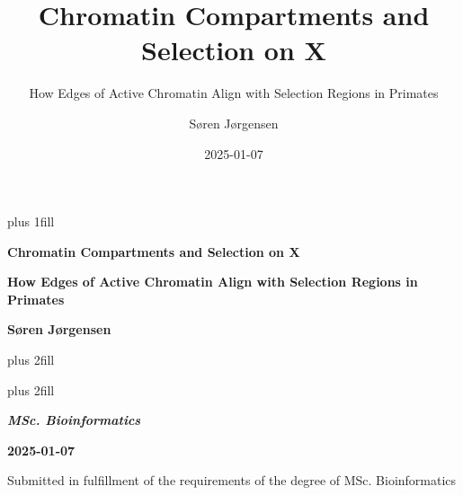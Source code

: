 \documentclass[
  11pt,
  a4paper,
]{scrbook}
\title{Chromatin Compartments and Selection on X}
\subtitle{How Edges of Active Chromatin Align with Selection Regions in
Primates}
\author{Søren Jørgensen}
\date{2025-01-07}
\begin{document}
\frontmatter
\cleardoublepage
\thispagestyle{empty}
{\centering
\hbox{}\vskip 0cm plus 1fill

{%
\Huge\bfseries Chromatin Compartments and Selection on X \par}
\vspace{3ex}
{\Large\bfseries How Edges of Active Chromatin Align with Selection
Regions in Primates \par}
\vspace{6ex}

    {\Large\bfseries Søren Jørgensen \par}
%
\vskip 0cm plus 2fill

{ \par}
\vskip 0cm plus 2fill

{\bfseries\Large\textit{MSc. Bioinformatics} \par}
\vspace{3ex}

{\bfseries\large 2025-01-07 \par}
\vspace{3ex}

\vspace{12ex}
{\small Submitted in fulfillment of the requirements
of the degree of MSc. Bioinformatics \par}
\pagebreak

}
\end{document}
